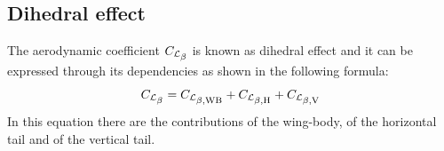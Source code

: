 \subsection{Dihedral effect}
\label{subsec2.2.1}

The aerodynamic coefficient $\CLbeta$ is known as dihedral effect and it can be expressed through its dependencies as shown in the following formula:
\begin{equation}
\label{eq:dihedraleffect}
\CLbeta =  \CLbetaWB + \CLbetaH + \CLbetaV
\end{equation}
In this equation there are the contributions of the wing-body, of the horizontal tail and of the vertical tail.

